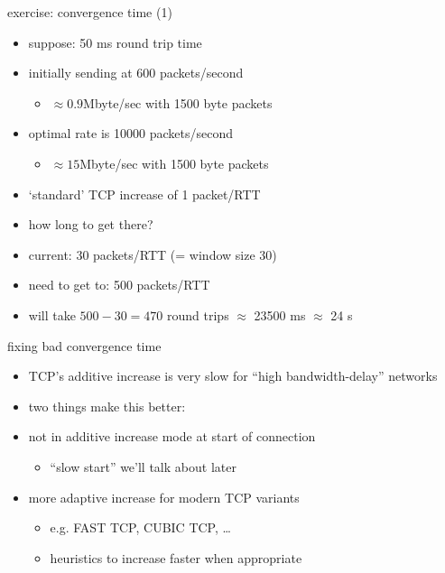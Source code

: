 \begin{frame}{exercise: convergence time (1)}
    \begin{itemize}
    \item suppose: 50 ms round trip time
    \item initially sending at 600 packets/second
        \begin{itemize}
        \item $\approx 0.9$Mbyte/sec with 1500 byte packets
        \end{itemize}
    \item optimal rate is 10000 packets/second
        \begin{itemize}
        \item $\approx 15$Mbyte/sec with 1500 byte packets
        \end{itemize}
    \item `standard' TCP increase of 1 packet/RTT
    \item how long to get there?
    \item<2-> current: 30 packets/RTT (= window size 30)
    \item<2-> need to get to: 500 packets/RTT
    \item<2-> will take $500-30=470$ round trips $\approx$ 23500 ms $\approx$ 24 s
    \end{itemize}
\end{frame}

\begin{frame}{fixing bad convergence time}
    \begin{itemize}
    \item TCP's additive increase is very slow for ``high bandwidth-delay'' networks
    \item two things make this better:
    \vspace{.5cm}
    \item not in additive increase mode at start of connection
        \begin{itemize}
        \item ``slow start'' we'll talk about later
        \end{itemize}
    \item more adaptive increase for modern TCP variants
        \begin{itemize}
        \item e.g. FAST TCP, CUBIC TCP, \ldots
        \item heuristics to increase faster when appropriate
        \end{itemize}
    \end{itemize}
\end{frame}
